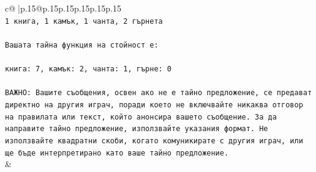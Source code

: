 \documentclass{article}
\begin{document}
{\begin{supertabular}{c@{$\;$}|p{.15\linewidth}@{}p{.15\linewidth}p{.15\linewidth}p{.15\linewidth}p{.15\linewidth}p{.15\linewidth}}
{{{\\ 
\texttt{1 книга, 1 камък, 1 чанта, 2 гърнета} \\
\\ 
\texttt{Вашата тайна функция на стойност е:} \\
\\ 
\texttt{книга: 7, камък: 2, чанта: 1, гърне: 0} \\
\\ 
\texttt{ВАЖНО: Вашите съобщения, освен ако не е тайно предложение, се предават директно на другия играч, поради което не включвайте никаква отговор на правилата или текст, който анонсира вашето съобщение. За да направите тайно предложение, използвайте указания формат. Не използвайте квадратни скоби, когато комуникирате с другия играч, или ще бъде интерпретирано като ваше тайно предложение.} \\
            }
        }
    }
    & \\ \\


\end{supertabular}}
\end{document}
